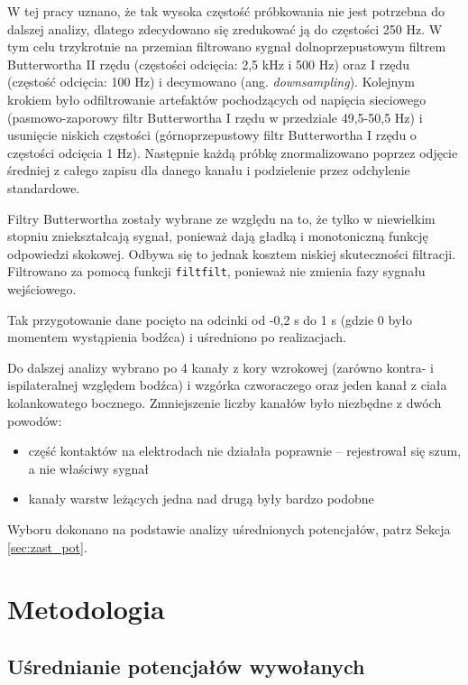 \documentclass{pracamgr_2}
\begin{document}
	W tej pracy uznano, że tak wysoka częstość próbkowania nie jest potrzebna do dalszej analizy, dlatego zdecydowano się zredukować ją do częstości 250 Hz. W tym celu trzykrotnie na przemian filtrowano sygnał dolnoprzepustowym filtrem Butterwortha II rzędu (częstości odcięcia: 2,5 kHz i 500 Hz) oraz I rzędu (częstość odcięcia: 100 Hz) i decymowano (ang. \textit{downsampling}). Kolejnym krokiem było odfiltrowanie artefaktów pochodzących od napięcia sieciowego (pasmowo-zaporowy filtr Butterwortha I rzędu w przedziale 49,5-50,5 Hz) i usunięcie niskich częstości (górnoprzepustowy filtr Butterwortha I rzędu o częstości odcięcia 1 Hz). Następnie każdą próbkę znormalizowano poprzez odjęcie średniej z całego zapisu dla danego kanału i podzielenie przez odchylenie standardowe.
	
	Filtry Butterwortha zostały wybrane ze względu na to, że tylko w niewielkim stopniu zniekształcają sygnał, ponieważ dają gładką i monotoniczną funkcję odpowiedzi skokowej. Odbywa się to jednak kosztem niskiej skuteczności filtracji. Filtrowano za pomocą funkcji \texttt{filtfilt}, ponieważ nie zmienia fazy sygnału wejściowego.
	
	Tak przygotowanie dane pocięto na odcinki od -0,2 s do 1 s (gdzie 0 było momentem wystąpienia bodźca) i uśredniono po realizacjach.
	
	Do dalszej analizy wybrano po 4 kanały z kory wzrokowej (zarówno kontra- i ispilateralnej względem bodźca) i wzgórka czworaczego oraz jeden kanał z ciała kolankowatego bocznego. Zmniejszenie liczby kanałów było niezbędne z dwóch powodów:
	\begin{itemize}
		\item część kontaktów na elektrodach nie działała poprawnie -- rejestrował się szum, a nie właściwy sygnał
		\item kanały warstw leżących jedna nad drugą były bardzo podobne
	\end{itemize}
	Wyboru dokonano na podstawie analizy uśrednionych potencjałów, patrz Sekcja \ref{sec:zast_pot}.
	\chapter{Metodologia}
	\section{Uśrednianie potencjałów wywołanych}
\end{document}
